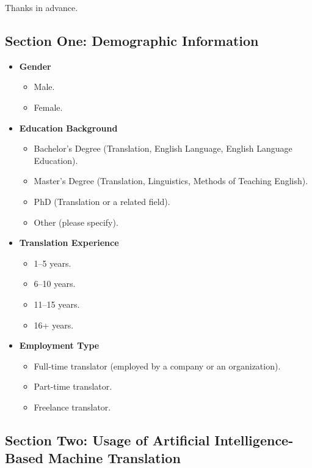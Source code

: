 \documentclass[english]{textolivre}
\begin{document}
Thanks in advance.

\bigskip

\subsection*{Section One: Demographic Information}

\begin{itemize}

\item \textbf{Gender}
\begin{itemize}
    \item Male.
    \item Female.
\end{itemize}

\item \textbf{Education Background}
\begin{itemize}
    \item Bachelor's Degree (Translation, English Language, English Language Education).
    \item Master's Degree (Translation, Linguistics, Methods of Teaching English).
    \item PhD (Translation or a related field).
    \item Other (please specify).
\end{itemize}

\item \textbf{Translation Experience}
\begin{itemize}
    \item 1--5 years.
    \item 6--10 years.
    \item 11--15 years.
    \item 16+ years.
\end{itemize}

\item \textbf{Employment Type}
\begin{itemize}
    \item Full-time translator (employed by a company or an organization).
    \item Part-time translator.
    \item Freelance translator.
\end{itemize}

\end{itemize}

\subsection*{Section Two: Usage of Artificial Intelligence-Based Machine Translation}
\end{document}
